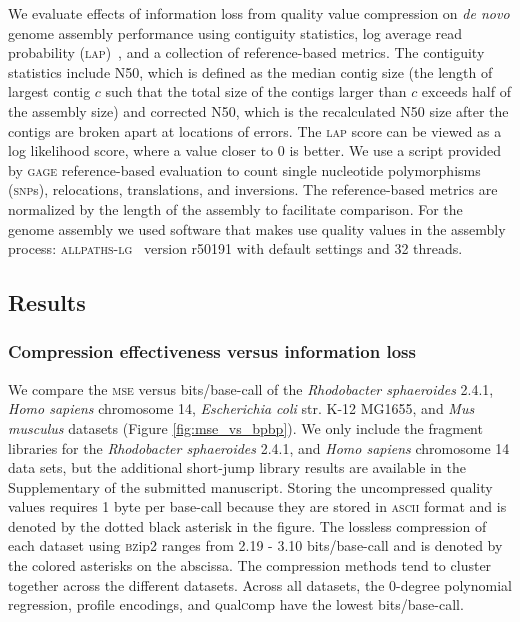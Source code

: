 \documentclass[12pt,\mydriver]{thesis}
\begin{document}
We evaluate effects of information loss from quality value compression
on \emph{de novo} genome assembly performance using contiguity
statistics, log average read probability
(\textsc{lap})~\cite{LAP}, and a collection of
reference-based metrics. The contiguity statistics include N50, which is defined as the median contig
size (the length of largest contig $c$ such that the total size of the
contigs larger than $c$ exceeds half of the assembly size) and corrected N50, which is the recalculated N50 size after the contigs are broken apart at locations of errors. The
\textsc{lap} score can be viewed as a log likelihood score, where a
value closer to 0 is better. We use a script provided by \textsc{gage}
reference-based evaluation to count single nucleotide polymorphisms
(\textsc{snp}s), relocations, translations, and inversions. The
reference-based metrics are normalized by the length of the assembly
to facilitate comparison. For the genome assembly we used software
that makes use quality values in the assembly process:
\textsc{allpaths-lg}~\cite{Gnerre:2011kx} version r50191 with default
settings and 32 threads.

\subsection{Results}

\subsubsection{Compression effectiveness versus information loss}

We compare the \textsc{mse} versus bits/base-call of the
\textit{Rhodobacter sphaeroides} 2.4.1, \textit{Homo sapiens}
chromosome 14, \textit{Escherichia coli} str. K-12 MG1655, and
\textit{Mus musculus} datasets (Figure \ref{fig:mse_vs_bpbp}). We
only include the fragment libraries for the \textit{Rhodobacter
  sphaeroides} 2.4.1, and \textit{Homo sapiens} chromosome 14 data
sets, but the additional short-jump library results are available in
the Supplementary of the submitted manuscript. Storing the uncompressed quality
values requires 1 byte per base-call because they are stored in
\textsc{ascii} format and is denoted by the dotted black asterisk in
the figure. The lossless compression of each dataset using \textsc{bz}ip2
ranges from 2.19 - 3.10 bits/base-call and is denoted by the colored
asterisks on the abscissa. The compression methods tend to cluster
together across the different datasets. Across all datasets, the
0-degree polynomial regression, profile encodings, and \textsc{q}ual\textsc{c}omp have
the lowest bits/base-call.
\end{document}
